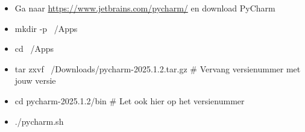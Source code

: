 \begin{itemize}
\item Ga naar \url{https://www.jetbrains.com/pycharm/} en download PyCharm
\item mkdir -p ~/Apps
\item cd ~/Apps
\item tar zxvf ~/Downloads/pycharm-2025.1.2.tar.gz # Vervang versienummer met jouw versie
\item cd pycharm-2025.1.2/bin # Let ook hier op het versienummer
\item ./pycharm.sh
\end{itemize}
